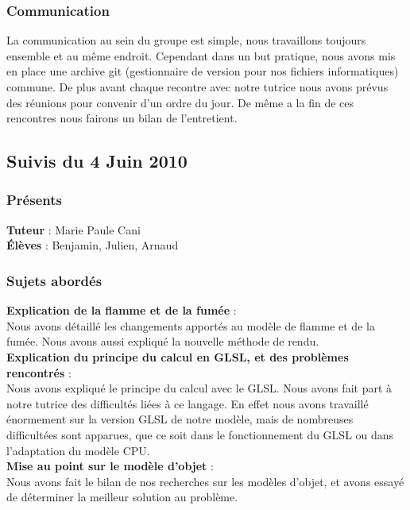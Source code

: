 \documentclass[a4paper,10pt]{article}
\begin{document}
\subsubsection{Communication}
La communication au sein du groupe est simple, nous travaillons
toujours ensemble et au même endroit. Cependant dans un but pratique,
nous avons mis en place une archive git (gestionnaire de version pour
nos fichiers informatiques) commune. De plus avant chaque recontre
avec notre tutrice nous avons prévus des réunions pour convenir d'un
ordre du jour. De même a la fin de ces rencontres nous fairons un
bilan de l'entretient.









\subsection{Suivis du  4 Juin 2010}
\subsubsection{Présents}
\textbf{Tuteur} : Marie Paule Cani\\
\textbf{Élèves} : Benjamin, Julien, Arnaud \\

\subsubsection{Sujets abordés}

\textbf{Explication de la flamme et de la fumée} :  \\
    Nous avons détaillé les changements apportés au modèle de flamme et de la fumée.
    Nous avons aussi expliqué la nouvelle méthode de rendu.\\
    
\textbf{Explication du principe du calcul en GLSL, et des problèmes rencontrés} :  \\
    Nous avons expliqué le principe du calcul avec le GLSL. Nous avons fait part à notre tutrice des 
    difficultés liées à ce langage. En effet nous avons travaillé énormement sur
    la version GLSL de notre modèle, mais de nombreuses difficultées sont apparues,
    que ce soit dans le fonctionnement du GLSL ou dans l'adaptation du modèle CPU.\\
    
\textbf{Mise au point sur le modèle d'objet} :  \\
    Nous avons fait le bilan de nos recherches sur les modèles d'objet, et avons essayé
    de déterminer la meilleur solution au problème. \\
\end{document}
